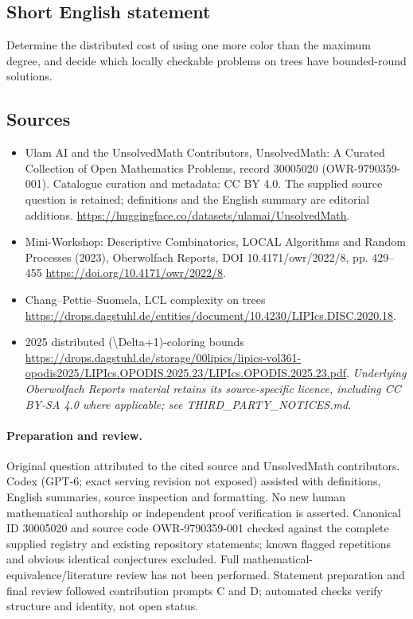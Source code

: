\documentclass[11pt]{article}
\begin{document}
\subsection{Short English statement}
Determine the distributed cost of using one more color than the maximum degree, and decide which locally checkable problems on trees have bounded-round solutions.
\subsection{Sources}
\begin{itemize}
\item[\hypertarget{source:30005020:1}{S1}] Ulam AI and the UnsolvedMath Contributors, UnsolvedMath: A Curated Collection of Open Mathematics Problems, record 30005020 (OWR-9790359-001). Catalogue curation and metadata: CC BY 4.0. The supplied source question is retained; definitions and the English summary are editorial additions.
\url{https://huggingface.co/datasets/ulamai/UnsolvedMath}.
\item[\hypertarget{source:30005020:2}{S2}] Mini-Workshop: Descriptive Combinatorics, LOCAL Algorithms and Random Processes (2023), Oberwolfach Reports, DOI 10.4171/owr/2022/8, pp. 429--455
\url{https://doi.org/10.4171/owr/2022/8}.
\item[\hypertarget{source:30005020:3}{S3}] Chang--Pettie--Suomela, LCL complexity on trees
\url{https://drops.dagstuhl.de/entities/document/10.4230/LIPIcs.DISC.2020.18}.
\item[\hypertarget{source:30005020:4}{S4}] 2025 distributed (\textbackslash{}Delta+1)-coloring bounds
\url{https://drops.dagstuhl.de/storage/00lipics/lipics-vol361-opodis2025/LIPIcs.OPODIS.2025.23/LIPIcs.OPODIS.2025.23.pdf}.
\textit{Underlying Oberwolfach Reports material retains its source-specific licence, including CC BY-SA 4.0 where applicable; see THIRD\_PARTY\_NOTICES.md.}
\end{itemize}
\paragraph{Preparation and review.}
Original question attributed to the cited source and UnsolvedMath contributors. Codex (GPT-6; exact serving revision not exposed) assisted with definitions, English summaries, source inspection and formatting. No new human mathematical authorship or independent proof verification is asserted. Canonical ID 30005020 and source code OWR-9790359-001 checked against the complete supplied registry and existing repository statements; known flagged repetitions and obvious identical conjectures excluded. Full mathematical-equivalence/literature review has not been performed. Statement preparation and final review followed contribution prompts C and D; automated checks verify structure and identity, not open status.
\label{end:30005020}
\end{document}

